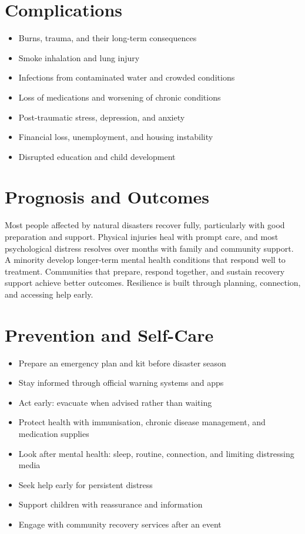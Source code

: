 \section*{Complications}
\begin{itemize}
    \item Burns, trauma, and their long-term consequences
    \item Smoke inhalation and lung injury
    \item Infections from contaminated water and crowded conditions
    \item Loss of medications and worsening of chronic conditions
    \item Post-traumatic stress, depression, and anxiety
    \item Financial loss, unemployment, and housing instability
    \item Disrupted education and child development
\end{itemize}

\section*{Prognosis and Outcomes}
Most people affected by natural disasters recover fully, particularly with good preparation and support. Physical injuries heal with prompt care, and most psychological distress resolves over months with family and community support. A minority develop longer-term mental health conditions that respond well to treatment. Communities that prepare, respond together, and sustain recovery support achieve better outcomes. Resilience is built through planning, connection, and accessing help early.

\section*{Prevention and Self-Care}
\begin{itemize}
    \item Prepare an emergency plan and kit before disaster season
    \item Stay informed through official warning systems and apps
    \item Act early: evacuate when advised rather than waiting
    \item Protect health with immunisation, chronic disease management, and medication supplies
    \item Look after mental health: sleep, routine, connection, and limiting distressing media
    \item Seek help early for persistent distress
    \item Support children with reassurance and information
    \item Engage with community recovery services after an event
\end{itemize}

